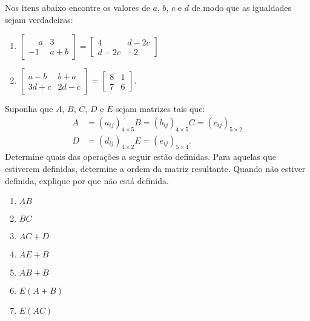 \documentclass[12pt]{exam}
\begin{document}
    \questao{}\label{igualdade_de_matrizes} Nos itens abaixo encontre os valores de $a$, $b$, $c$ e $d$ de modo que as igualdades sejam verdadeiras:
    \begin{enumerate}[label={\alph*})]
        \item $\begin{bmatrix}\phantom{-} a & 3\\-1 & a + b\end{bmatrix} = \begin{bmatrix}4 & d - 2c\\d - 2c & -2\end{bmatrix}$
        \item $\begin{bmatrix}a - b & b + a\\3d + c & 2d - c\end{bmatrix} = \begin{bmatrix}8 & 1\\7 & 6\end{bmatrix}$.
    \end{enumerate}

    \vspace{.3cm}

    \questao{} Suponha que $A$, $B$, $C$, $D$ e $E$ sejam matrizes tais que:
    \begin{align*}
        A &= (a_{ij})_{4 \times 5}
        B = (b_{ij})_{4 \times 5}
        C = (c_{ij})_{5 \times 2}\\
        D &= (d_{ij})_{4 \times 2}
        E = (e_{ij})_{5 \times 4}.
    \end{align*}
    Determine quais das operações a seguir estão definidas. Para aquelas que estiverem definidas, determine a ordem da matriz resultante. Quando não estiver definida, explique por que não está definida.
    \begin{multicols}{2}
        \begin{enumerate}[label={\alph*})]
            \item $AB$

            \item $BC$

            \item $AC + D$

            \item $AE + B$

            \item $AB + B$

            \item $E(A + B)$

            \item $E(AC)$

        \end{enumerate}
    \end{multicols}
\end{document}
